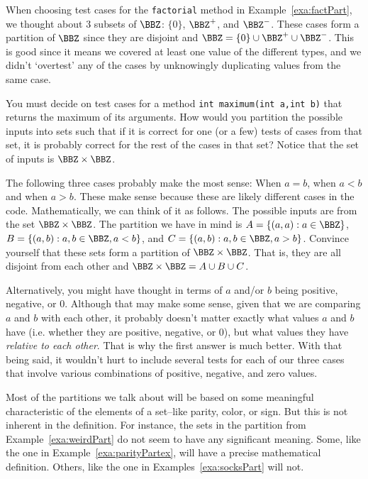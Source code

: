 \begin{exa}
When choosing test cases for the \verb+factorial+ method in Example~\ref{exa:factPart}, 
we thought about 3 subsets of $\BBZ$: $\{0\}$, $\BBZ^{+}$, and $\BBZ^{-}$.  
These cases form a partition of $\BBZ$ since they are disjoint and $\BBZ=\{0\}\cup\BBZ^{+}\cup\BBZ^{-}$.
This is good since it means we covered at least one value of the different types, and we didn't `overtest'
any of the cases by unknowingly duplicating values from the same case.
\end{exa}

\begin{exer}\label{exer:maxPart}
You must decide on test cases for a method \verb+int maximum(int a,int b)+ that returns the
maximum of its arguments.  How would you partition the possible inputs into sets such that if
it is correct for one (or a few) tests of cases from that set, it is probably correct for the
rest of the cases in that set?  Notice that the set of inputs is $\BBZ\times\BBZ$.

\noindent
\answerlinethree
\begin{answer}
The following three cases probably make the most sense: When $a=b$, when $a<b$ and when $a>b$.
These make sense because these are likely different cases in the code.
Mathematically, we can think of it as follows.  The possible inputs are from the set $\BBZ\times\BBZ$.
The partition we have in mind is $A=\{(a,a) : a\in \BBZ\}$, $B=\{(a,b) : a,b\in \BBZ, a<b\}$, and
$C=\{(a,b) : a,b\in \BBZ, a>b\}$.  Convince yourself that these sets form a partition of $\BBZ\times\BBZ$.
That is, they are all disjoint from each other and $\BBZ\times\BBZ =A\cup B\cup C$.  

Alternatively, you might have thought in terms of $a$ and/or $b$ being positive, negative, or $0$.
Although that may make some sense, given that we are comparing $a$ and $b$ with each other, it probably
doesn't matter exactly what values $a$ and $b$ have (i.e. whether they are positive, negative, or $0$),
but what values they have {\em relative to each other}.  That is why the first answer is much better.
With that being said, it wouldn't hurt to include several tests for each of our three cases that involve
various combinations of positive, negative, and zero values.
\end{answer}
\end{exer}

Most of the partitions we talk about will be based on some meaningful characteristic of the
elements of a set--like parity, color, or sign.  
But this is not inherent in the definition.
For instance, the sets in the partition from Example~\ref{exa:weirdPart} do not seem to have
any significant meaning.
Some, like the one in Example~\ref{exa:parityPartex}, will have a precise mathematical definition.  
Others, like the one in Examples~\ref{exa:socksPart} will not.

